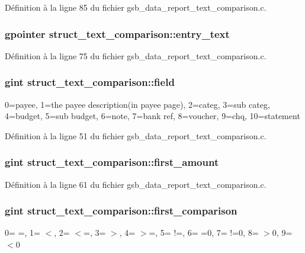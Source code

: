 Définition à la ligne 85 du fichier gsb\_\-data\_\-report\_\-text\_\-comparison.c.

\subsubsection[{entry\_\-text}]{\setlength{\rightskip}{0pt plus 5cm}gpointer {\bf struct\_\-text\_\-comparison::entry\_\-text}}\label{structstruct__text__comparison_a3d52cb1211b82148c53f0730768bacfc}


Définition à la ligne 75 du fichier gsb\_\-data\_\-report\_\-text\_\-comparison.c.

\subsubsection[{field}]{\setlength{\rightskip}{0pt plus 5cm}gint {\bf struct\_\-text\_\-comparison::field}}\label{structstruct__text__comparison_ac91775a34ab54b3902b19dc28d60e879}
0=payee, 1=the payee description(in payee page), 2=categ, 3=sub categ, 4=budget, 5=sub budget, 6=note, 7=bank ref, 8=voucher, 9=chq, 10=statement 

Définition à la ligne 51 du fichier gsb\_\-data\_\-report\_\-text\_\-comparison.c.

\subsubsection[{first\_\-amount}]{\setlength{\rightskip}{0pt plus 5cm}gint {\bf struct\_\-text\_\-comparison::first\_\-amount}}\label{structstruct__text__comparison_a3405fc9a321c6798c71d2978eec86ac6}


Définition à la ligne 61 du fichier gsb\_\-data\_\-report\_\-text\_\-comparison.c.

\subsubsection[{first\_\-comparison}]{\setlength{\rightskip}{0pt plus 5cm}gint {\bf struct\_\-text\_\-comparison::first\_\-comparison}}\label{structstruct__text__comparison_a8c3791fb6a97dc1e32eb8f7cc5157c5e}
0= =, 1= $<$, 2= $<$=, 3= $>$, 4= $>$=, 5= !=, 6= =0, 7= !=0, 8= $>$0, 9= $<$0 

